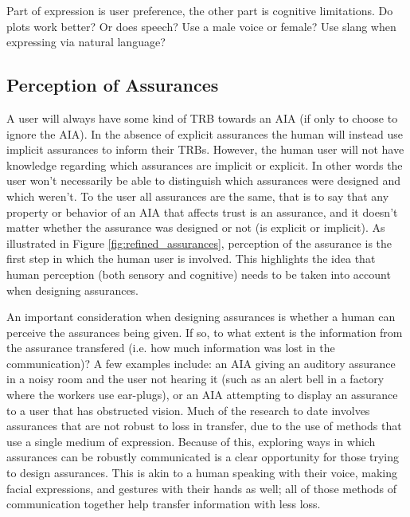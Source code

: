      Part of expression is user preference, the other part is cognitive limitations. Do plots work better? Or does speech? Use a male voice or female? Use slang when expressing via natural language?

\subsection{Perception of Assurances}
    A user will always have some kind of TRB towards an AIA (if only to choose to ignore the AIA). In the absence of explicit assurances the human will instead use implicit assurances to inform their TRBs. However, the human user will not have knowledge regarding which assurances are implicit or explicit. In other words the user won't necessarily be able to distinguish which assurances were designed and which weren't. To the user all assurances are the same, that is to say that any property or behavior of an AIA that affects trust is an assurance, and it doesn't matter whether the assurance was designed or not (is explicit or implicit). As illustrated in Figure \ref{fig:refined_assurances}, perception of the assurance is the first step in which the human user is involved. This highlights the idea that human perception (both sensory and cognitive) needs to be taken into account when designing assurances.

    An important consideration when designing assurances is whether a human can perceive the assurances being given. If so, to what extent is the information from the assurance transfered (i.e. how much information was lost in the communication)? A few examples include: an AIA giving an auditory assurance in a noisy room and the user not hearing it (such as an alert bell in a factory where the workers use ear-plugs), or an AIA attempting to display an assurance to a user that has obstructed vision. Much of the research to date involves assurances that are not robust to loss in transfer, due to the use of methods that use a single medium of expression. Because of this, exploring ways in which assurances can be robustly communicated is a clear opportunity for those trying to design assurances. This is akin to a human speaking with their voice, making facial expressions, and gestures with their hands as well; all of those methods of communication together help transfer information with less loss.

